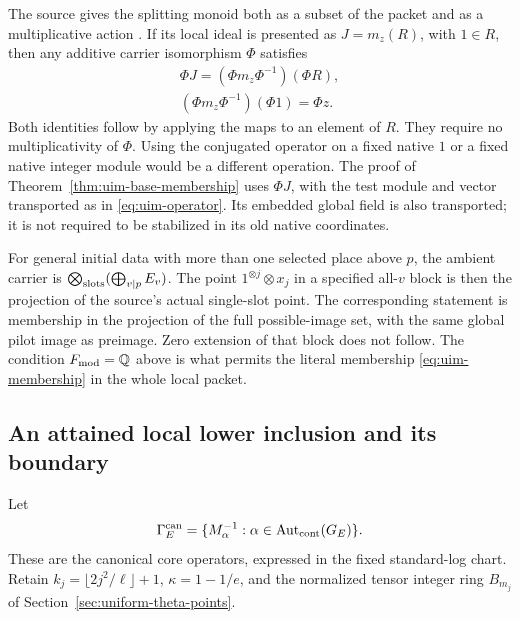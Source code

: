 \begin{remark}
\label{rem:uim-operator}
The source gives the splitting monoid
both as a subset of the packet
and as a multiplicative action
\cite[Theorem~3.11(i)(b),
pp.~153--154]{IUT3}.
If its local ideal is presented
as \(J=m_z(R)\), with \(1\in R\),
then any additive carrier
isomorphism \(\Phi\) satisfies
\begin{equation}\label{eq:uim-operator}
 \begin{gathered}
 \Phi J=(\Phi m_z\Phi^{-1})(\Phi R),\\
       (\Phi m_z\Phi^{-1})(\Phi1)=\Phi z .
 \end{gathered}
\end{equation}
Both identities follow by applying
the maps to an element of \(R\).
They require no multiplicativity
of \(\Phi\).
Using the conjugated operator
on a fixed native \(1\) or a
fixed native integer module
would be a different operation.
The proof of
Theorem~\ref{thm:uim-base-membership}
uses \(\Phi J\), with the test
module and vector transported
as in \eqref{eq:uim-operator}.
Its embedded global field is
also transported; it is not
required to be stabilized in
its old native coordinates.
\end{remark}

For general initial data with more
than one selected place above \(p\),
the ambient carrier is
\(\bigotimes_{\rm slots}
(\bigoplus_{v\mid p}E_v)\).
The point \(1^{\otimes j}\otimes x_j\)
in a specified all-\(v\) block
is then the projection of the
source's actual single-slot
point. The corresponding
statement is membership in
the projection of the full
possible-image set, with the
same global pilot image as
preimage. Zero extension of
that block does not follow.
The condition \(F_{\rm mod}=\mathbb Q\)
above is what permits the
literal membership
\eqref{eq:uim-membership}
in the whole local packet.

\subsection{An attained local lower inclusion and its boundary}

Let
\[
 \Gamma_E^{\rm can}
   =\{M_\alpha^{-1}:
          \alpha\in\operatorname{Aut}_{\rm cont}(G_E)\}.
\]
These are the canonical core
operators, expressed in the
fixed standard-log chart.
Retain \(k_j=\lfloor2j^2/\ell\rfloor+1\),
\(\kappa=1-1/e\), and the
normalized tensor integer ring
\(B_{m_j}\) of
Section~\ref{sec:uniform-theta-points}.

